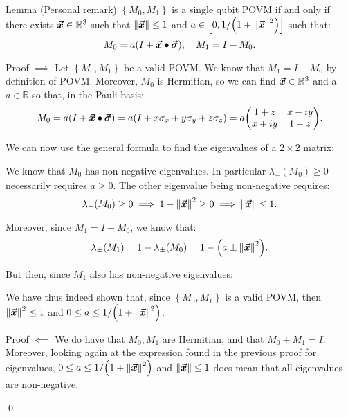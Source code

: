 \documentclass[a4paper]{article}
\begin{document}
\begin{parag}{Lemma (Personal remark)}
    $\left\{M_0, M_1\right\}$ is a single qubit POVM if and only if there exists $\bm{\protect\vec{x}} \in \mathbb{R}^3$ such that $\left\|\bvec{x}\right\| \leq 1$ and $a \in \left[0, 1/\left(1 + \left\|\bvec{x}\right\|^2\right)\right]$ such that: 
    \[M_0 = a \left(I + \bvec{x} \dotprod \bvec{\sigma}\right), \mathspace M_1 = I - M_0.\]
    
    \begin{subparag}{Proof $\implies$}
        Let $\left\{M_0, M_1\right\}$ be a valid POVM. We know that $M_1 = I - M_0$ by definition of POVM. Moreover, $M_0$ is Hermitian, so we can find $\bm{\protect\vec{x}} \in \mathbb{R}^3$ and a $a \in \mathbb{R}$ so that, in the Pauli basis: 
        \[M_0 = a \left(I + \bvec{x} \dotprod \bvec{\sigma}\right) = a\left(I + x \sigma_x + y \sigma_y + z \sigma_z\right) = a \begin{pmatrix} 1 + z & x - iy \\ x + iy & 1- z \end{pmatrix}.\]
        
        We can now use the general formula to find the eigenvalues of a $2\times 2$ matrix: 

        We know that $M_0$ has non-negative eigenvalues. In particular $\lambda_+\left(M_0\right) \geq 0$ necessarily requires $a \geq 0$. The other eigenvalue being non-negative requires:
        \[\lambda_{-}\left(M_0\right) \geq 0 \implies 1 - \left\|\bvec{x}\right\|^2 \geq 0 \implies \left\|\bvec{x}\right\| \leq 1.\]

        Moreover, since $M_1 = I - M_0$, we know that: 
        \[\lambda_{\pm}\left(M_1\right) = 1 - \lambda_{\pm}\left(M_0\right) = 1 - \left(a \pm \left\|\bvec{x}\right\|^2\right).\]
        
        But then, since $M_1$ also has non-negative eigenvalues: 
        
        We have thus indeed shown that, since $\left\{M_0, M_1\right\}$ is a valid POVM, then $\left\|\bvec{x}\right\|^2 \leq 1$ and $0 \leq a \leq 1/\left(1 + \left\|\bvec{x}\right\|^2\right)$.
    \end{subparag}

    \begin{subparag}{Proof $\impliedby$}
        We do have that $M_0, M_1$ are Hermitian, and that $M_0 + M_1 = I$. Moreover, looking again at the expression found in the previous proof for eigenvalues, $0 \leq a \leq 1/\left(1 + \left\|\bvec{x}\right\|^2\right)$ and $\left\|\bvec{x}\right\| \leq 1$ does mean that all eigenvalues are non-negative.

        \qed
    \end{subparag}
\end{parag}
\end{document}
